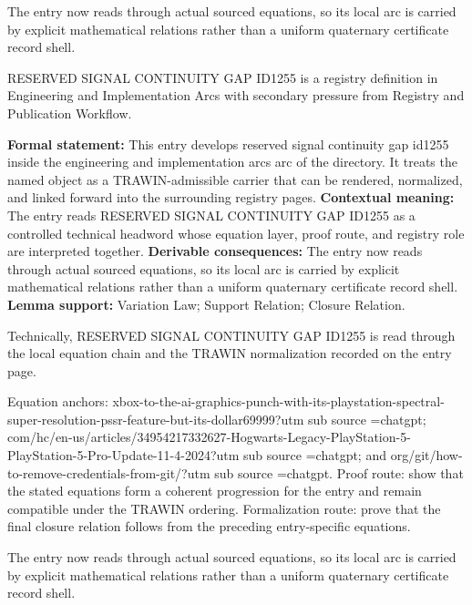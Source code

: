 The entry now reads through actual sourced equations, so its local arc is carried by explicit mathematical relations rather than a uniform quaternary certificate record shell.
\clearpage


\begingroup\small
{}
RESERVED SIGNAL CONTINUITY GAP ID1255 is a registry definition in Engineering and Implementation Arcs with secondary pressure from Registry and Publication Workflow.

\begingroup\footnotesize\setlength{\emergencystretch}{3em}\sloppy
\textbf{Formal statement:} This entry develops reserved signal continuity gap id1255 inside the engineering and implementation arcs arc of the directory. It treats the named object as a TRAWIN-admissible carrier that can be rendered, normalized, and linked forward into the surrounding registry pages. \textbf{Contextual meaning:} The entry reads RESERVED SIGNAL CONTINUITY GAP ID1255 as a controlled technical headword whose equation layer, proof route, and registry role are interpreted together. \textbf{Derivable consequences:} The entry now reads through actual sourced equations, so its local arc is carried by explicit mathematical relations rather than a uniform quaternary certificate record shell. \textbf{Lemma support:} Variation Law; Support Relation; Closure Relation.\par
\endgroup

Technically, RESERVED SIGNAL CONTINUITY GAP ID1255 is read through the local equation chain and the TRAWIN normalization recorded on the entry page.

Equation anchors: xbox-to-the-ai-graphics-punch-with-its-playstation-spectral-super-resolution-pssr-feature-but-its-dollar69999?utm sub source =chatgpt; com/hc/en-us/articles/34954217332627-Hogwarts-Legacy-PlayStation-5-PlayStation-5-Pro-Update-11-4-2024?utm sub source =chatgpt; and org/git/how-to-remove-credentials-from-git/?utm sub source =chatgpt. Proof route: show that the stated equations form a coherent progression for the entry and remain compatible under the TRAWIN ordering. Formalization route: prove that the final closure relation follows from the preceding entry-specific equations.

The entry now reads through actual sourced equations, so its local arc is carried by explicit mathematical relations rather than a uniform quaternary certificate record shell.
\endgroup


